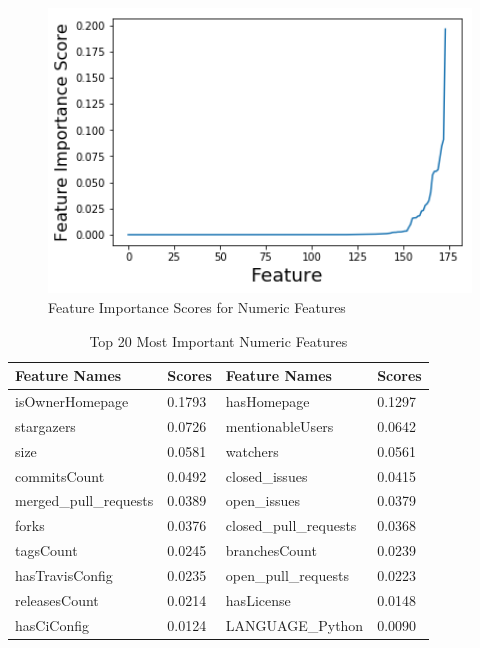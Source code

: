 \begin{figure}[h]
	\centering
		\includegraphics[width=12cm]{graphics/feature_importance_numeric.png}
	\caption{Feature Importance Scores for Numeric Features}
	\label{feature_importance_numeric_graphic}
\end{figure}

\begin{table}[h]
	\centering
	\caption{Top 20 Most Important Numeric Features}
	\label{feature_importance_numeric}
	\begin{tabular}{|l|l|l|l|}
	\hline
		Feature Names & Scores & Feature Names & Scores \\ \hline
		isOwnerHomepage  &   0.1793 & hasHomepage & 0.1297 \\ \hline
		stargazers  &   0.0726 & mentionableUsers & 0.0642 \\ \hline
		size  &   0.0581 & watchers & 0.0561 \\ \hline
		commitsCount  &   0.0492 & closed\_issues & 0.0415 \\ \hline
		merged\_pull\_requests  &   0.0389 & open\_issues & 0.0379 \\ \hline
		forks  &   0.0376 & closed\_pull\_requests & 0.0368 \\ \hline
		tagsCount  &   0.0245 & branchesCount & 0.0239 \\ \hline
		hasTravisConfig  &   0.0235 & open\_pull\_requests & 0.0223 \\ \hline
		releasesCount  &   0.0214 & hasLicense & 0.0148 \\ \hline
		hasCiConfig  &   0.0124 & LANGUAGE\_Python & 0.0090 \\ \hline
	\end{tabular}
\end{table}
